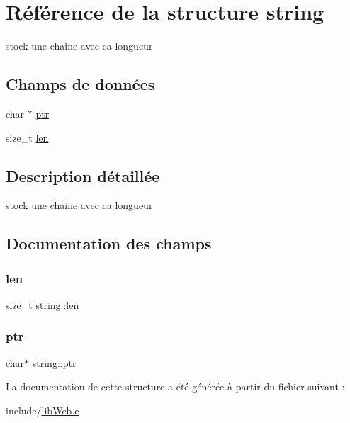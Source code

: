 \hypertarget{structstring}{}\section{Référence de la structure string}
\label{structstring}


stock une chaine avec ca longueur  


\subsection*{Champs de données}
\begin{DoxyCompactItemize}
\item 
char $\ast$ \hyperlink{structstring_aa1b2f3a2ddd1ed38245b8d4590aadf93}{ptr}
\item 
size\+\_\+t \hyperlink{structstring_aa6bcf0353fd5cf2f374a9b1dd0e4a73a}{len}
\end{DoxyCompactItemize}


\subsection{Description détaillée}
stock une chaine avec ca longueur 

\subsection{Documentation des champs}
\mbox{\label{structstring_aa6bcf0353fd5cf2f374a9b1dd0e4a73a}} 
\subsubsection{\texorpdfstring{len}{len}}
{\footnotesize\ttfamily size\+\_\+t string\+::len}

\mbox{\label{structstring_aa1b2f3a2ddd1ed38245b8d4590aadf93}} 
\subsubsection{\texorpdfstring{ptr}{ptr}}
{\footnotesize\ttfamily char$\ast$ string\+::ptr}



La documentation de cette structure a été générée à partir du fichier suivant \+:\begin{DoxyCompactItemize}
\item 
include/\hyperlink{lib_web_8c}{lib\+Web.\+c}\end{DoxyCompactItemize}
